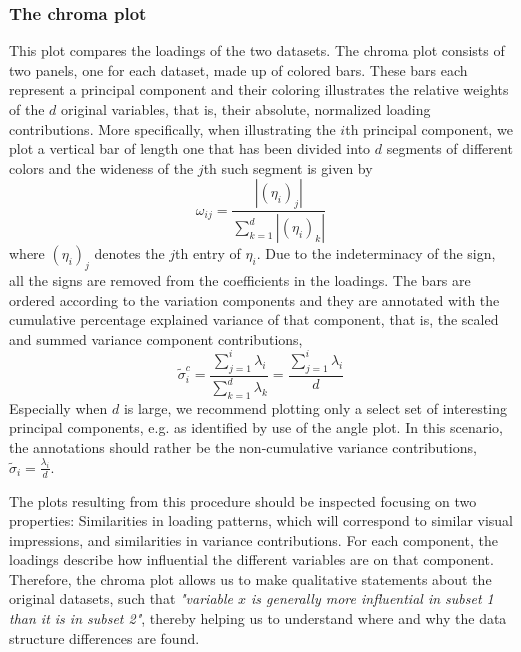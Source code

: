 \documentclass[titlepage,11pt,twoside]{article}
\begin{document}
\subsubsection{The chroma plot}
This plot compares the loadings of the two datasets. The chroma plot consists of two panels, one for each dataset, made up of colored bars. These bars each represent a principal component and their coloring illustrates the relative weights of the $d$ original variables, that is, their absolute, normalized loading contributions. More specifically, when illustrating the $i$th principal component, we plot a vertical bar of length one that has been divided into $d$ segments of different colors and the wideness of the $j$th such segment is given by 
$$\omega_{ij} = \frac{|(\eta_i)_j|}{\sum_{k=1}^d |(\eta_i)_k|}$$
where $(\eta_i)_j$ denotes the $j$th entry of $\eta_i$. Due to the indeterminacy of the sign, all the signs are removed from the coefficients in the loadings. The bars are ordered according to the variation components and they are annotated with the cumulative percentage explained variance of that component, that is, the scaled and summed variance component contributions,
$$\tilde\sigma^c_i = \frac{\sum_{j = 1}^i \lambda_i}{\sum_{k=1}^d \lambda_k} = \frac{\sum_{j = 1}^i \lambda_i}{d}$$
Especially when $d$ is large, we recommend plotting only a select set of interesting principal components, e.g. as identified by use of the angle plot. In this scenario, the annotations should rather be the non-cumulative variance contributions, $\tilde\sigma_i = \frac{\lambda_i}{d}$. 

The plots resulting from this procedure should be inspected focusing on two properties: Similarities in loading patterns, which will correspond to similar visual impressions, and similarities in variance contributions. For each component, the loadings describe how influential the different variables are on that component. Therefore, the chroma plot allows us to make qualitative statements about the original datasets, such that \textit{"variable $x$ is generally more influential in subset 1 than it is in subset 2"}, thereby helping us to understand where and why the data structure differences are found. 
\end{document}

